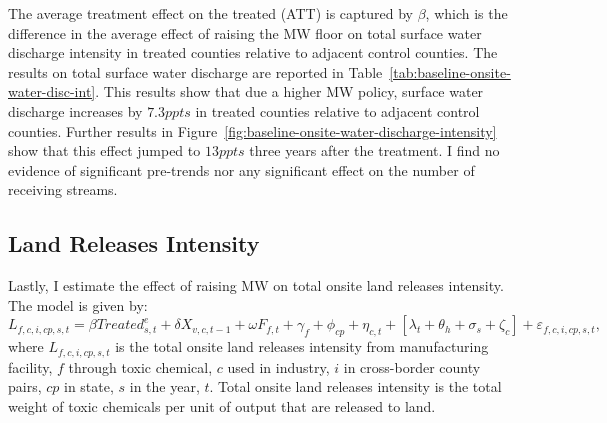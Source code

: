 \documentclass[12pt, english]{article}
\begin{document}
    The average treatment effect on the treated (ATT) is captured by $\beta$, which is the difference in the average effect of raising the MW floor on total surface water discharge intensity in treated counties relative to adjacent control counties. The results on total surface water discharge are reported in Table~\ref{tab:baseline-onsite-water-disc-int}. This results show that due a higher MW policy, surface water discharge increases by $7.3ppts$ in treated counties relative to adjacent control counties. Further results in Figure~\ref{fig:baseline-onsite-water-discharge-intensity} show that this effect jumped to $13ppts$ three years after the treatment. I find no evidence of significant pre-trends nor any significant effect on the number of receiving streams.
    

    \subsection{Land Releases Intensity}\label{subsec:land-releases-intensity}
    Lastly, I estimate the effect of raising MW on total onsite land releases intensity. The model is given by:
    \begin{equation}
        L_{f,c,i,cp,s,t} = \beta Treated_{s,t}^e + \delta X_{v,c,t-1} + \omega F_{f,t} + \gamma_{f} + \phi_{cp} + \eta_{c,t} + \left[\lambda_{t} + \theta_{h} + \sigma_{s} + \zeta_{c} \right] + \varepsilon_{f,c,i,cp,s,t},\label{eq:baseline-onsite-land-releases-intensity}
    \end{equation}
    where $L_{f,c,i,cp,s,t}$ is the total onsite land releases intensity from manufacturing facility, $f$ through toxic chemical, $c$ used in industry, $i$ in cross-border county pairs, $cp$ in state, $s$ in the year, $t$. Total onsite land releases intensity is the total weight of toxic chemicals per unit of output that are released to land.
    
\end{document}
